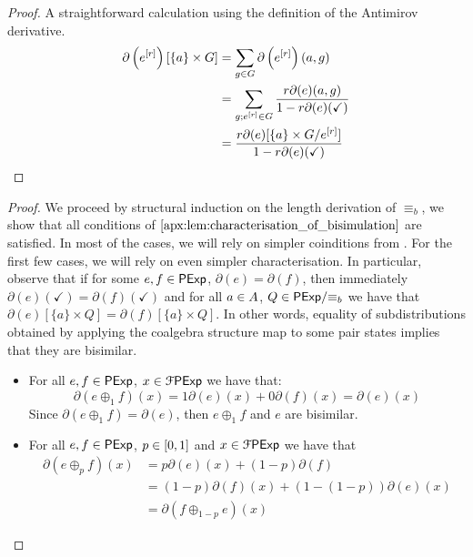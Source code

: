 \begin{proof}
    A straightforward calculation using the definition of the Antimirov derivative.
    \begin{align*}
        \partial\left(e^{[r]}\right)[\{a\} \times G] &= \sum_{g \in G}\partial\left(e^{[r]}\right)(a,g)\\
        &=\sum_{g \mathbin{;} e^{[r]} \in G} \frac{r\partial(e)(a,g)}{1-r\partial(e)(\checkmark)}\\
        &=\frac{r\partial(e)[\{a\} \times {G}/{e^{[r]}}]}{1-r\partial(e)(\checkmark)}\qedhere
    \end{align*}
\end{proof}
\soundnessbisim*
\begin{proof} We proceed by structural induction on the length derivation of $\equiv_b$, we show that all conditions of $\Cref{apx:lem:characterisation_of_bisimulation}$ are satisfied. In most of the cases, we will rely on simpler coinditions from . For the first few cases, we will rely on even simpler characterisation. In particular, observe that if for some $e,f \in \mathsf{PExp}$, $\partial(e) = \partial(f)$, then immediately $\partial(e)(\checkmark)=\partial(f)(\checkmark)$ and for all $a \in {A}$, $Q \in {\mathsf{PExp}}/{\equiv_b}$ we have that $\partial(e)[\{a\}\times Q] = \partial(f)[\{a\}\times Q]$. In other words, equality of subdistributions obtained by applying the coalgebra structure map to some pair states implies that they are bisimilar.
    \begin{itemize}[leftmargin=0em]
        \item[] 
        For all $e,f \in \mathsf{PExp}$, $x \in\mathcal{F} \mathsf{PExp} $ we have that: 
        $$
        \partial(e \oplus_1 f)(x) = 1\partial(e)(x) + 0 \partial(f)(x) = \partial(e)(x)
        $$
        Since $\partial(e \oplus_1 f) = \partial(e)$, then $e \oplus_1 f$ and $e$ are bisimilar.

        \item[]  
        For all $e,f  \in \mathsf{PExp}$, $p \in \interval{0}{1}$ and $x \in\mathcal{F} \mathsf{PExp}$ we have that
        \begin{align*}
            \partial(e \oplus_p f)(x) &= p \partial(e)(x) + (1-p) \partial(f)\\
            &= (1-p) \partial(f)(x)  + (1-(1-p))\partial(e)(x)\\ &= \partial(f \oplus_{1-p} e)(x) 
        \end{align*}


\end{itemize}
\end{proof}
